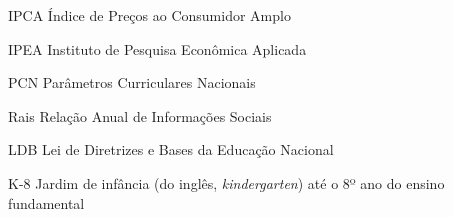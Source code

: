 \begin{siglas}
  \item[IPCA] Índice de Preços ao Consumidor Amplo
  \item[IPEA] Instituto de Pesquisa Econômica Aplicada
  \item[PCN] Parâmetros Curriculares Nacionais
  \item[Rais] Relação Anual de Informações Sociais
  \item[LDB] Lei de Diretrizes e Bases da Educação Nacional
  \item[K-8] Jardim de infância (do inglês, \textit{kindergarten}) até o 8º ano do ensino fundamental
\end{siglas}